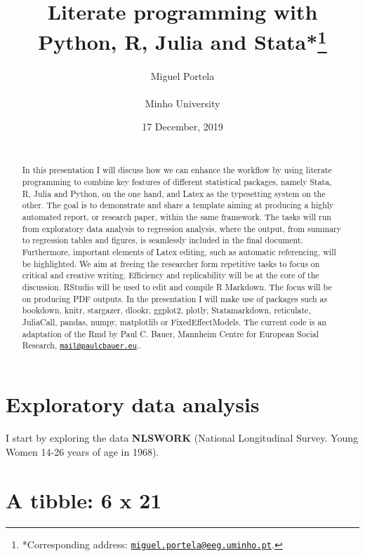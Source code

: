 \documentclass[
  12pt,
]{article}
\title{\vspace{1cm}Literate programming with Python, R, Julia and Stata*\footnote{*Corresponding address: \href{mailto:miguel.portela@eeg.uminho.pt}{\nolinkurl{miguel.portela@eeg.uminho.pt}}.}\vspace{0.5cm}\\}
\author{Miguel Portela\\
~\\
Minho University\\}
\date{17 December, 2019\\
~\\}
\begin{document}
\maketitle
\begin{abstract}
\noindent{}In this presentation I will discuss how we can enhance the workflow by using literate programming to combine key features of different statistical packages, namely Stata, R, Julia and Python, on the one hand, and Latex as the typesetting system on the other. The goal is to demonstrate and share a template aiming at producing a highly automated report, or research paper, within the same framework. The tasks will run from exploratory data analysis to regression analysis, where the output, from summary to regression tables and figures, is seamlessly included in the final document. Furthermore, important elements of Latex editing, such as automatic referencing, will be highlighted. We aim at freeing the researcher form repetitive tasks to focus on critical and creative writing. Efficiency and replicability will be at the core of the discussion. RStudio will be used to edit and compile R Markdown. The focus will be on producing PDF outputs. In the presentation I will make use of packages such as bookdown, knitr, stargazer, dlookr, ggplot2, plotly, Statamarkdown, reticulate, JuliaCall, pandas, numpy, matplotlib or FixedEffectModels. The current code is an adaptation of the Rmd by Paul C. Bauer, Mannheim Centre for European Social Research, \href{mailto:mail@paulcbauer.eu}{\nolinkurl{mail@paulcbauer.eu}}..\vspace{.8cm}
\end{abstract}

\clearpage

\renewcommand{\baselinestretch}{0.5}\normalsize

\renewcommand{\baselinestretch}{1.1}\normalsize

\clearpage

\hypertarget{exploratory-data-analysis}{%
\section{Exploratory data analysis}\label{exploratory-data-analysis}}

I start by exploring the data \textbf{NLSWORK} (National Longitudinal Survey. Young Women 14-26 years of age in 1968).

\hypertarget{a-tibble-6-x-21}{%
\section{A tibble: 6 x 21}\label{a-tibble-6-x-21}}
\end{document}
